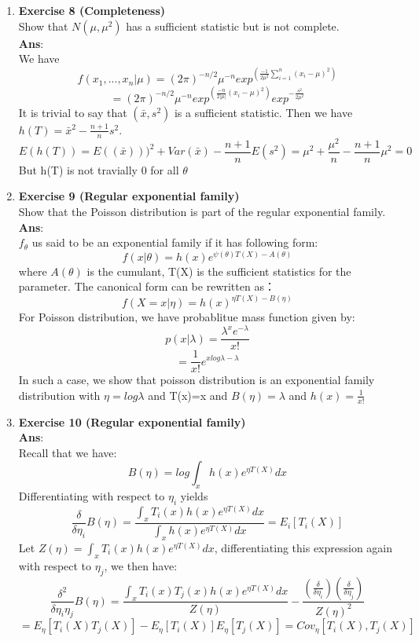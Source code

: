 \documentclass{article}
\begin{document}
\begin{enumerate}
\item \textbf{Exercise 8 (Completeness)} \\
Show that $N(\mu,\mu^2)$ has a sufficient statistic but is not complete. \\
\textbf{Ans}: \\
We have $$
f(x_1,...,x_n|\mu)=(2\pi)^{-n/2}\mu^{-n}exp^{(\frac{-1}{2\mu^2}\sum_{i=1}^{n}(x_i-\mu)^2)}
$$
$$
=(2\pi)^{-n/2}\mu^{-n}exp^{(\frac{-n}{2|\mu|}(x_i-\mu)^2)}exp^{-\frac{s^2}{2\mu^2}}
$$
It is trivial to say that $(\bar x, s^2)$ is a sufficient statistic. Then we have $h(T)=\bar x^2 -\frac{n+1}{n}s^2$. 
$$
E(h(T))=E((\bar x)))^2 + Var(\bar x) -\frac{n+1}{n}E(s^2)=\mu^2+\frac{\mu^2}{n}-\frac{n+1}{n}\mu^2=0
$$
But h(T) is not travially 0 for all $\theta$


\item \textbf{Exercise 9 (Regular exponential family)} \\
 Show that the Poisson distribution is part of the regular exponential family.\\
\textbf{Ans}: \\
$f_\theta$ us said to be an exponential family if it has following form: 
$$f(x|\theta)=h(x)e^{\psi(\theta)T(X)-A(\theta)}$$ where $A(\theta)$ is the cumulant, T(X) is the sufficient statistics for the parameter. The canonical form can be rewritten as：
$$f(X=x|\eta)=h(x)^{\eta T(X)-B(\eta)}$$ 
For Poisson distribution, we have probablitue mass function given by: 
$$
p(x|\lambda)=\frac{\lambda^x e^{-\lambda}}{x!}
$$
$$
=\frac{1}{x!} e^{xlog\lambda -\lambda}
$$
In such a case, we show that poisson distribution is an exponential family distribution with $\eta=log \lambda $ and T(x)=x and $B(\eta)= \lambda $ and $h(x)=\frac{1}{x!}$

\item \textbf{Exercise 10 (Regular exponential family)} \\
\textbf{Ans}: \\
Recall that we have: 
$$B(\eta)=log \int _x h(x)e^{\eta T(X)} dx$$
Differentiating with respect to $\eta_i$ yields
$$
\frac{\delta}{\delta \eta_i}B(\eta)=\frac{\int _x T_i(x)h(x)e^{\eta T(X)} dx}{\int _x h(x)e^{\eta T(X)} dx}= E_i[T_i(X)]
$$ 
Let $Z(\eta)=\int _x T_i(x)h(x)e^{\eta T(X)}dx$, differentiating this expression again with respect to $\eta_j$, we then have: 
$$
\frac{\delta^2}{\delta\eta_i\eta_j}B(\eta)=\frac{\int _x T_i(x)T_j(x)h(x)e^{\eta T(X)} dx}{Z(\eta)}-\frac{(\frac{\delta}{\delta\eta_i})(\frac{\delta}{\delta\eta_j})}{Z(\eta)^2}
$$
$$
=E_\eta[T_i(X)T_j(X)]-E_\eta[T_i(X)]E_\eta[T_j(X)]
=Cov_\eta[T_i(X),T_j(X)]
$$


\end{enumerate}
\end{document}
